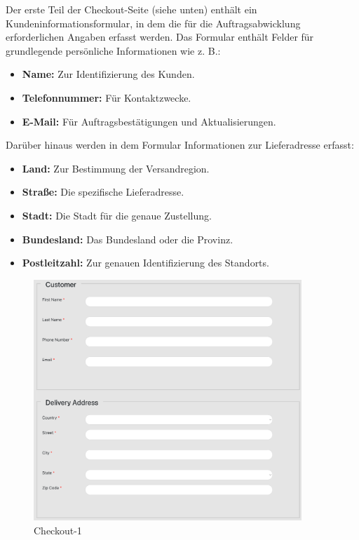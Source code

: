 Der erste Teil der Checkout-Seite (siehe unten) enthält ein Kundeninformationsformular, in dem die für die Auftragsabwicklung erforderlichen Angaben erfasst werden. Das Formular enthält Felder für grundlegende persönliche Informationen wie z. B.:

\begin{itemize}
	\item \textbf{Name:} Zur Identifizierung des Kunden.
	\item \textbf{Telefonnummer:} Für Kontaktzwecke.
	\item \textbf{E-Mail:} Für Auftragsbestätigungen und Aktualisierungen.
\end{itemize}

Darüber hinaus werden in dem Formular Informationen zur Lieferadresse erfasst:

\begin{itemize}
	\item \textbf{Land:} Zur Bestimmung der Versandregion.
	\item \textbf{Straße:} Die spezifische Lieferadresse.
	\item \textbf{Stadt:} Die Stadt für die genaue Zustellung.
	\item \textbf{Bundesland:} Das Bundesland oder die Provinz.
	\item \textbf{Postleitzahl:} Zur genauen Identifizierung des Standorts.
\end{itemize}

\begin{figure}[H]  
	\centering %
	\includegraphics[width=0.9\textwidth]{Images/Checkout_1.png} 
	\caption{Checkout-1} 
	\label{fig:sample3-image} 
\end{figure}

